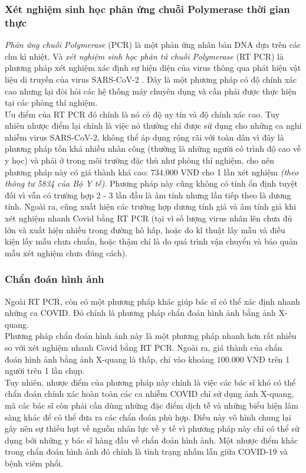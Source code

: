 \documentclass{article}
\begin{document}
\subsubsection{Xét nghiệm sinh học phản ứng chuỗi Polymerase thời gian thực}
\textit{Phản ứng chuỗi Polymerase} (PCR) là một phản ứng nhân bản DNA dựa trên các chu kì nhiệt. Và \textit{xét nghiệm sinh học phân tử chuỗi Polymerase} (RT PCR) là phương pháp xét nghiệm xác định sự hiện diện của virus thông qua phát hiện vật liệu di truyền của virus SARS-CoV-2 \cite{ncov}. Đây là một phương pháp có độ chính xác cao nhưng lại đòi hỏi các hệ thống máy chuyên dụng và cần phải được thực hiện tại các phòng thí nghiệm.\\

Ưu điểm của RT PCR đó chính là nó có độ uy tín và độ chính xác cao. Tuy nhiên nhược điểm lại chính là việc nó thường chỉ được sử dụng cho những ca nghi nhiễm virus SARS-CoV-2, không thể áp dụng rộng rãi với toàn dân vì đây là phương pháp tốn khá nhiều nhân công (thường là những người có trình độ cao về y học) và phải ở trong môi trường đặc thù như phòng thí nghiệm, cho nên phương pháp này có giá thành khá cao: $734.000$ VNĐ cho 1 lần xét nghiệm \textit{(theo thông tư 5834 của Bộ Y tế)}. Phương pháp này cũng không có tính ổn định tuyệt đối vì vẫn có trường hợp 2 - 3 lần đầu là âm tính nhưng lần tiếp theo là dương tính. Ngoài ra, cũng xuất hiện các trường hợp dương tính giả và âm tính giả khi xét nghiệm nhanh Covid bằng RT PCR (tại vì số lượng virus nhân lên chưa đủ lớn và xuất hiện nhiều trong đường hô hấp, hoặc do kĩ thuật lấy mẫu và điều kiện lấy mẫu chưa chuẩn, hoặc thậm chí là do quá trình vận chuyển và bảo quản mẫu xét nghiệm chưa đúng cách).

\subsubsection{Chẩn đoán hình ảnh}
Ngoài RT PCR, còn có một phương pháp khác giúp bác sĩ có thể xác định nhanh những ca COVID. Đó chính là phương pháp chẩn đoán hình ảnh bằng ảnh X-quang.\\

Phương pháp chẩn đoán hình ảnh này là một phương pháp nhanh hơn rất nhiều so với xét nghiệm nhanh Covid bằng RT PCR. Ngoài ra, giá thành của chẩn đoán hình ảnh bằng ảnh X-quang là thấp, chỉ vào khoảng $100.000$ VNĐ trên 1 người trên 1 lần chụp.\\

Tuy nhiên, nhược điểm của phương pháp này chính là việc các bác sĩ khó có thể chẩn đoán chính xác hoàn toàn các ca nhiễm COVID chỉ sử dụng ảnh X-quang, mà các bác sĩ còn phải cần dùng những đặc điểm dịch tễ và những biểu hiện lâm sàng khác để có thể đưa ra các chẩn đoán phù hợp. Điều này vô hình chung lại gây nên sự thiếu hụt về nguồn nhân lực về y tế vì phương pháp này chỉ có thể sử dụng bởi những y bác sĩ hàng đầu về chẩn đoán hình ảnh. Một nhược điểm khác trong chẩn đoán hình ảnh đó chính là tình trạng nhầm lẫn giữa COVID-19 và bệnh viêm phổi.\\
\end{document}
